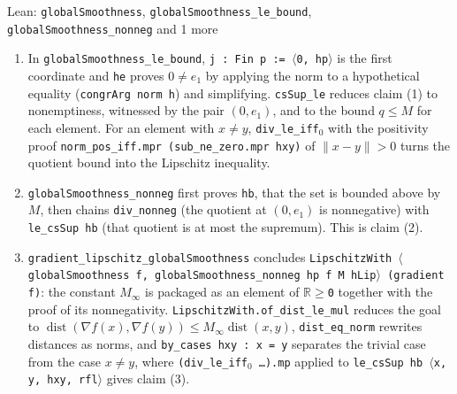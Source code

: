 \documentclass[11pt,a4paper]{report}
\begin{document}
\begin{leanbox}{Lean: \texttt{globalSmoothness}, \texttt{globalSmoothness\_\allowbreak{}le\_\allowbreak{}bound}, \texttt{globalSmoothness\_\allowbreak{}nonneg} and 1 more}
\begin{enumerate}


\item In \texttt{global\allowbreak{}Smoothness\_\allowbreak{}le\_\allowbreak{}bound}, \texttt{j : Fin p := \ensuremath{\langle}0, hp\ensuremath{\rangle}} is the first coordinate and \texttt{he} proves \(0\ne e_1\) by applying the norm to a hypothetical equality (\texttt{congr\allowbreak{}Arg norm h}) and simplifying. \texttt{cs\allowbreak{}Sup\_\allowbreak{}le} reduces claim (1) to nonemptiness, witnessed by the pair \((0,e_1)\), and to the bound \(q\le M\) for each element. For an element with \(x\ne y\), \texttt{div\_\allowbreak{}le\_\allowbreak{}iff\ensuremath{{}_{0}}} with the positivity proof \texttt{norm\_\allowbreak{}pos\_\allowbreak{}iff.\allowbreak{}mpr (sub\_\allowbreak{}ne\_\allowbreak{}zero.\allowbreak{}mpr hxy)} of \(\|x-y\|>0\) turns the quotient bound into the Lipschitz inequality.

\item \texttt{global\allowbreak{}Smoothness\_\allowbreak{}nonneg} first proves \texttt{hb}, that the set is bounded above by \(M\), then chains \texttt{div\_\allowbreak{}nonneg} (the quotient at \((0,e_1)\) is nonnegative) with \texttt{le\_\allowbreak{}cs\allowbreak{}Sup hb} (that quotient is at most the supremum). This is claim (2).

\item \texttt{gradient\_\allowbreak{}lipschitz\_\allowbreak{}global\allowbreak{}Smoothness} concludes \texttt{Lipschitz\allowbreak{}With \ensuremath{\langle}global\allowbreak{}Smoothness f, global\allowbreak{}Smoothness\_\allowbreak{}nonneg hp f M h\allowbreak{}Lip\ensuremath{\rangle} (gradient f)}: the constant \(M_\infty\) is packaged as an element of \texttt{\ensuremath{\mathbb R}\ensuremath{\ge}0} together with the proof of its nonnegativity. \texttt{Lipschitz\allowbreak{}With.\allowbreak{}of\_\allowbreak{}dist\_\allowbreak{}le\_\allowbreak{}mul} reduces the goal to \(\operatorname{dist}(\nabla f(x),\nabla f(y))\le M_\infty\operatorname{dist}(x,y)\), \texttt{dist\_\allowbreak{}eq\_\allowbreak{}norm} rewrites distances as norms, and \texttt{by\_\allowbreak{}cases hxy : x = y} separates the trivial case from the case \(x\ne y\), where \texttt{(div\_\allowbreak{}le\_\allowbreak{}iff\ensuremath{{}_{0}} …).\allowbreak{}mp} applied to \texttt{le\_\allowbreak{}cs\allowbreak{}Sup hb \ensuremath{\langle}x, y, hxy, rfl\ensuremath{\rangle}} gives claim (3).

\end{enumerate}
\end{leanbox}
\end{document}
